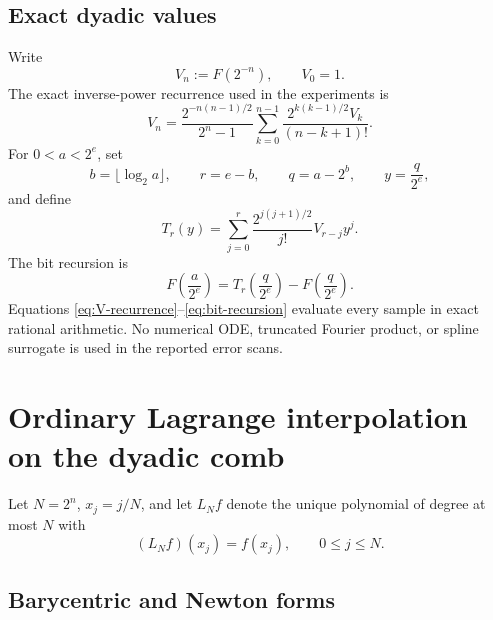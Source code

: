 \documentclass[11pt,oneside]{article}
\numberwithin{equation}{section}
\theoremstyle{definition}
\theoremstyle{remark}
\begin{document}
\subsection{Exact dyadic values}

Write
\begin{equation}
 V_n:=F(2^{-n}),\qquad V_0=1.
\end{equation}
The exact inverse-power recurrence used in the experiments is
\begin{equation}
 V_n=\frac{2^{-n(n-1)/2}}{2^n-1}
       \sum_{k=0}^{n-1}\frac{2^{k(k-1)/2}V_k}{(n-k+1)!}.
 \label{eq:V-recurrence}
\end{equation}
For $0<a<2^e$, set
\begin{equation}
 b=\lfloor\log_2a\rfloor,\qquad r=e-b,\qquad q=a-2^b,
 \qquad y=\frac{q}{2^e},
\end{equation}
and define
\begin{equation}
 T_r(y)=\sum_{j=0}^{r}
        \frac{2^{j(j+1)/2}}{j!}V_{r-j}y^j.
 \label{eq:T-block}
\end{equation}
The bit recursion is
\begin{equation}
 F\!\left(\frac{a}{2^e}\right)
   =T_r\!\left(\frac{q}{2^e}\right)
    -F\!\left(\frac{q}{2^e}\right).
 \label{eq:bit-recursion}
\end{equation}
Equations \eqref{eq:V-recurrence}--\eqref{eq:bit-recursion} evaluate every sample in exact
rational arithmetic.  No numerical ODE, truncated Fourier product, or spline surrogate is
used in the reported error scans.

\section{Ordinary Lagrange interpolation on the dyadic comb}
\label{sec:ordinary}

Let $N=2^n$, $x_j=j/N$, and let $L_Nf$ denote the unique polynomial of degree at most $N$
with
\begin{equation}
 (L_Nf)(x_j)=f(x_j),\qquad 0\le j\le N.
\end{equation}

\subsection{Barycentric and Newton forms}
\end{document}
